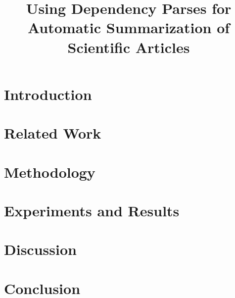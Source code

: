 \documentclass[11pt]{article}
\title{Using Dependency Parses for Automatic Summarization of Scientific Articles}
\date{}
\begin{document}
\maketitle
\begin{abstract}

\end{abstract}

\section{Introduction}
\label{section:introduction}


\section{Related Work}
\label{section:related work}


\section{Methodology}
\label{section:tasummarization}


\section{Experiments and Results}
\label{section:experiments}


\section{Discussion}
\label{section:discussion}


\section{Conclusion}
\label{section:conclusion}






\end{document}
